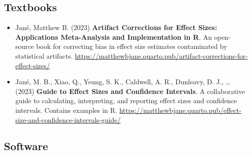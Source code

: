 \documentclass[
  letterpaper,
  DIV=11,
  numbers=noendperiod]{scrartcl}
\begin{document}
\hypertarget{textbooks}{%
\subsection{\texorpdfstring{ Textbooks}{ Textbooks}}\label{textbooks}}

\begin{itemize}
\item
  Jané, Matthew B. (2023) \textbf{Artifact Corrections for Effect Sizes:
  Applications Meta-Analysis and Implementation in R}. An open-source
  book for correcting bias in effect size estimates contaminated by
  statistical artifacts.
  \url{https://matthewbjane.quarto.pub/artifact-corrections-for-effect-sizes/}
\item
  Jané, M. B., Xiao, Q., Yeung, S. K., Caldwell, A. R., Dunleavy, D. J.,
  \ldots{} (2023) \textbf{Guide to Effect Sizes and Confidence
  Intervals}. A collaborative guide to calculating, interpreting, and
  reporting effect sizes and confidence intervals. Contains examples in
  R.
  \url{https://matthewbjane.quarto.pub/effect-size-and-confidence-intervals-guide/}
\end{itemize}

\hypertarget{software}{%
\subsection{\texorpdfstring{ Software}{ Software}}\label{software}}
\end{document}
